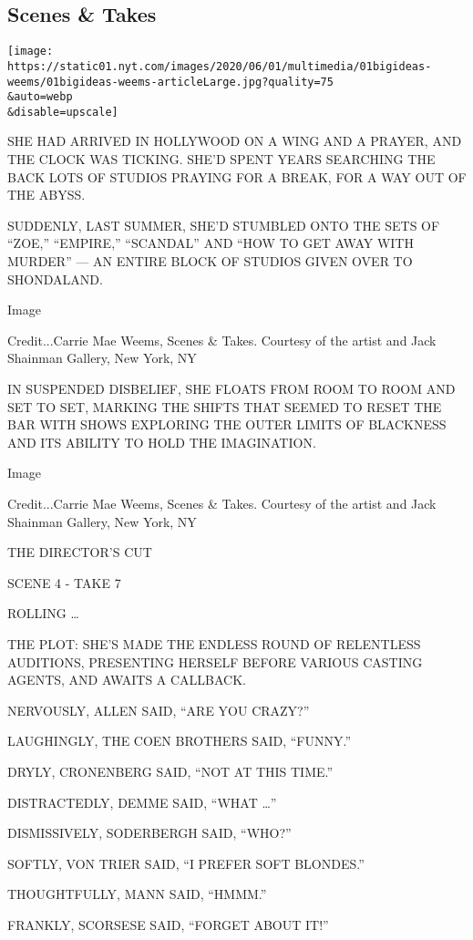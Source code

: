 \hypertarget{scenes--takes}{%
\subsection{Scenes \& Takes}\label{scenes--takes}}

\texttt{[image: https://static01.nyt.com/images/2020/06/01/multimedia/01bigideas-weems/01bigideas-weems-articleLarge.jpg?quality=75\\\&auto=webp\\\&disable=upscale]}

SHE HAD ARRIVED IN HOLLYWOOD ON A WING AND A PRAYER, AND THE CLOCK WAS
TICKING. SHE'D SPENT YEARS SEARCHING THE BACK LOTS OF STUDIOS PRAYING
FOR A BREAK, FOR A WAY OUT OF THE ABYSS.

SUDDENLY, LAST SUMMER, SHE'D STUMBLED ONTO THE SETS OF ``ZOE,''
``EMPIRE,'' ``SCANDAL'' AND ``HOW TO GET AWAY WITH MURDER'' --- AN
ENTIRE BLOCK OF STUDIOS GIVEN OVER TO SHONDALAND.

Image

Credit...Carrie Mae Weems, Scenes \& Takes. Courtesy of the artist and
Jack Shainman Gallery, New York, NY

IN SUSPENDED DISBELIEF, SHE FLOATS FROM ROOM TO ROOM AND SET TO SET,
MARKING THE SHIFTS THAT SEEMED TO RESET THE BAR WITH SHOWS EXPLORING THE
OUTER LIMITS OF BLACKNESS AND ITS ABILITY TO HOLD THE IMAGINATION.

Image

Credit...Carrie Mae Weems, Scenes \& Takes. Courtesy of the artist and
Jack Shainman Gallery, New York, NY

THE DIRECTOR'S CUT

SCENE 4 - TAKE 7

ROLLING \ldots{}

THE PLOT: SHE'S MADE THE ENDLESS ROUND OF RELENTLESS AUDITIONS,
PRESENTING HERSELF BEFORE VARIOUS CASTING AGENTS, AND AWAITS A CALLBACK.

NERVOUSLY, ALLEN SAID, ``ARE YOU CRAZY?''

LAUGHINGLY, THE COEN BROTHERS SAID, ``FUNNY.''

DRYLY, CRONENBERG SAID, ``NOT AT THIS TIME.''

DISTRACTEDLY, DEMME SAID, ``WHAT \ldots''

DISMISSIVELY, SODERBERGH SAID, ``WHO?''

SOFTLY, VON TRIER SAID, ``I PREFER SOFT BLONDES.''

THOUGHTFULLY, MANN SAID, ``HMMM.''

FRANKLY, SCORSESE SAID, ``FORGET ABOUT IT!''

